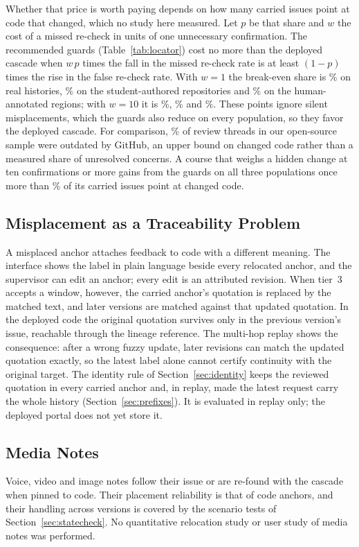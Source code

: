 Whether that price is worth paying depends on how many carried issues point at code that changed, which no study here measured. Let $p$ be that share and $w$ the cost of a missed re-check in units of one unnecessary confirmation. The recommended guards (Table~\ref{tab:locator}) cost no more than the deployed cascade when $w\,p$ times the fall in the missed re-check rate is at least $(1-p)$ times the rise in the false re-check rate. With $w=1$ the break-even share is \wiRealBreakEvenOne\% on real histories, \wiStuBreakEvenOne\% on the student-authored repositories and \wiHumBreakEvenOne\% on the human-annotated regions; with $w=10$ it is \wiRealBreakEvenTen\%, \wiStuBreakEvenTen\% and \wiHumBreakEvenTen\%. These points ignore silent misplacements, which the guards also reduce on every population, so they favor the deployed cascade. For comparison, \wpeOutdatedPct\% of review threads in our open-source sample were outdated by GitHub, an upper bound on changed code rather than a measured share of unresolved concerns. A course that weighs a hidden change at ten confirmations or more gains from the guards on all three populations once more than \wiHumBreakEvenTen\% of its carried issues point at changed code.

\subsection{Misplacement as a Traceability Problem}
A misplaced anchor attaches feedback to code with a different meaning. The interface shows the label in plain language beside every relocated anchor, and the supervisor can edit an anchor; every edit is an attributed revision. When tier~3 accepts a  window, however, the carried anchor's quotation is replaced by the matched text, and later versions are matched against that updated quotation. In the deployed code the original quotation survives only in the previous version's issue, reachable through the lineage reference. The multi-hop replay shows the consequence: after a wrong fuzzy update, later revisions can match the updated quotation exactly, so the latest label alone cannot certify continuity with the original target. The identity rule of Section~\ref{sec:identity} keeps the reviewed quotation in every carried anchor and, in replay, made the latest request carry the whole history (Section~\ref{sec:prefixes}). It is evaluated in replay only; the deployed portal does not yet store it.

\subsection{Media Notes}
Voice, video and image notes follow their issue or are re-found with the cascade when pinned to code. Their placement reliability is that of code anchors, and their handling across versions is covered by the scenario tests of Section~\ref{sec:statecheck}. No quantitative relocation study or user study of media notes was performed.

